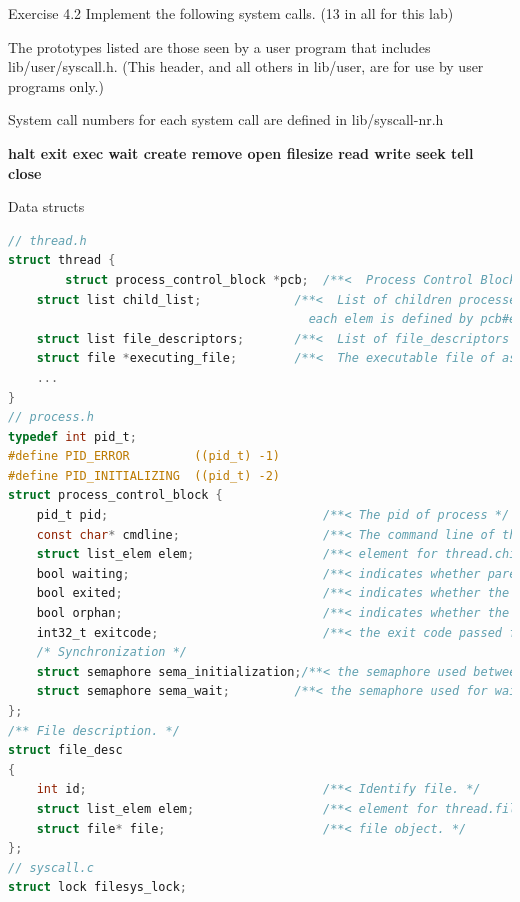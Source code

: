 \documentclass[10pt]{beamer}
\begin{document}
\begin{frame}[fragile]{Exercise 4.2}
Implement the following system calls. (13 in all for this lab)

The prototypes listed are those seen by a user program that includes lib/user/syscall.h. (This header, and all others in lib/user, are for use by user programs only.)

System call numbers for each system call are defined in lib/syscall-nr.h

\textbf{halt exit exec wait create remove open filesize read write seek tell close}
\end{frame}
\begin{frame}[fragile]{Data structs}
    \begin{lstlisting}[language=C]
// thread.h
struct thread {
        struct process_control_block *pcb;  /**<  Process Control Block */
    struct list child_list;             /**<  List of children processes of this thread,
                                          each elem is defined by pcb#elem */
    struct list file_descriptors;       /**<  List of file_descriptors the thread contains */
    struct file *executing_file;        /**<  The executable file of associated process. */
    ...
}
// process.h
typedef int pid_t;
#define PID_ERROR         ((pid_t) -1)
#define PID_INITIALIZING  ((pid_t) -2)
struct process_control_block {
    pid_t pid;                              /**< The pid of process */
    const char* cmdline;                    /**< The command line of this process being executed */
    struct list_elem elem;                  /**< element for thread.child_list */    
    bool waiting;                           /**< indicates whether parent process is waiting on this. */
    bool exited;                            /**< indicates whether the process is done (exited). */
    bool orphan;                            /**< indicates whether the parent process has terminated before. */
    int32_t exitcode;                       /**< the exit code passed from exit(), when exited = true */
    /* Synchronization */
    struct semaphore sema_initialization;/**< the semaphore used between start_process() and process_execute()*/
    struct semaphore sema_wait;         /**< the semaphore used for wait() : parent blocks until child exits*/
};
/** File description. */
struct file_desc 
{
    int id;                                 /**< Identify file. */
    struct list_elem elem;                  /**< element for thread.file_descriptors */
    struct file* file;                      /**< file object. */
};
// syscall.c
struct lock filesys_lock;
\end{lstlisting}
\end{frame}
\end{document}
